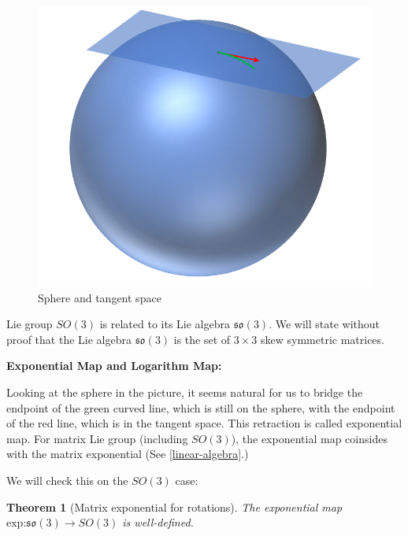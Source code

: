 \documentclass[
]{book}
\newtheorem{theorem}{Theorem}[chapter]
\theoremstyle{definition}
\theoremstyle{definition}
\theoremstyle{definition}
\theoremstyle{definition}
\theoremstyle{remark}
\begin{document}
\begin{figure}

{\centering \includegraphics[width=1\linewidth]{images/sphere} 

}

\caption{Sphere and tangent space}\label{fig:sphere}
\end{figure}

Lie group \(SO(3)\) is related to its Lie algebra \(\mathfrak{so}(3)\). We will state without proof that the Lie algebra \(\mathfrak{so}(3)\) is the set of \(3\times 3\) skew symmetric matrices.

\textbf{Exponential Map and Logarithm Map:}

Looking at the sphere in the picture, it seems natural for us to bridge the endpoint of the green curved line, which is still on the sphere, with the endpoint of the red line, which is in the tangent space. This retraction is called exponential map. For matrix Lie group (including \(SO(3)\)), the exponential map coinsides with the matrix exponential (See \ref{linear-algebra}.)

We will check this on the \(SO(3)\) case:

\begin{theorem}[Matrix exponential for rotations]
\protect\hypertarget{thm:matrixexprotation}{}\label{thm:matrixexprotation}The exponential map \(\text{exp:}\mathfrak{so}(3)\to SO(3)\) is well-defined.
\end{theorem}
\end{document}
